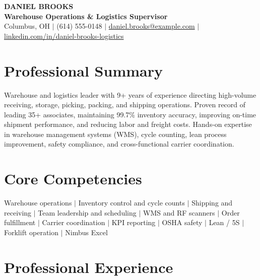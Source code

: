 \documentclass[10pt,letterpaper]{article}
\begin{document}
\color{slate}

\begin{center}
  {\huge\bfseries\color{navy} DANIEL BROOKS}\\[0.10em]
  {\large\bfseries Warehouse Operations \& Logistics Supervisor}\\[0.22em]
  Columbus, OH \enspace $\vert$ \enspace (614) 555-0148 \enspace $\vert$ \enspace
  \href{mailto:daniel.brooks@example.com}{daniel.brooks@example.com} \enspace $\vert$ \enspace
  \href{https://www.linkedin.com/in/daniel-brooks-logistics}{linkedin.com/in/daniel-brooks-logistics}
\end{center}
\vspace{-0.58em}

\section*{Professional Summary}
Warehouse and logistics leader with 9+ years of experience directing high-volume receiving, storage, picking, packing, and shipping operations. Proven record of leading 35+ associates, maintaining 99.7\% inventory accuracy, improving on-time shipment performance, and reducing labor and freight costs. Hands-on expertise in warehouse management systems (WMS), cycle counting, lean process improvement, safety compliance, and cross-functional carrier coordination.

\section*{Core Competencies}
Warehouse operations \enspace $\vert$ \enspace Inventory control and cycle counts \enspace $\vert$ \enspace Shipping and receiving \enspace $\vert$ \enspace Team leadership and scheduling \enspace $\vert$ \enspace WMS and RF scanners \enspace $\vert$ \enspace Order fulfillment \enspace $\vert$ \enspace Carrier coordination \enspace $\vert$ \enspace KPI reporting \enspace $\vert$ \enspace OSHA safety \enspace $\vert$ \enspace Lean / 5S \enspace $\vert$ \enspace Forklift operation \enspace $\vert$ \enspace Nimbus Excel

\section*{Professional Experience}
\end{document}
